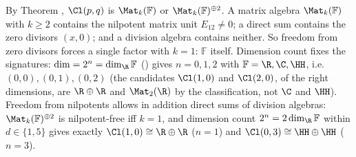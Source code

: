 By Theorem , $\Cl(p,q)$ is $\Mat_k(\mathbb{F})$ or $\Mat_k(\mathbb{F})^{\oplus 2}$. A matrix algebra $\Mat_k(\mathbb{F})$ with $k \geq 2$ contains the nilpotent matrix unit $E_{12} \neq 0$; a direct sum contains the zero divisors $(x, 0)$; and a division algebra contains neither. So freedom from zero divisors forces a single factor with $k = 1$: $\mathbb{F}$ itself. Dimension count fixes the signatures: $\dim = 2^n = \dim_\R \mathbb{F}$ () gives $n = 0, 1, 2$ with $\mathbb{F} = \R, \C, \HH$, i.e.\ $(0,0), (0,1), (0,2)$ (the candidates $\Cl(1,0)$ and $\Cl(2,0)$, of the right dimensions, are $\R \oplus \R$ and $\Mat_2(\R)$ by the classification, not $\C$ and $\HH$). Freedom from nilpotents allows in addition direct sums of division algebras: $\Mat_k(\mathbb{F})^{\oplus 2}$ is nilpotent-free iff $k = 1$, and dimension count $2^n = 2\dim_\R \mathbb{F}$ within $d \in \{1,5\}$ gives exactly $\Cl(1,0) \cong \R \oplus \R$ ($n=1$) and $\Cl(0,3) \cong \HH \oplus \HH$ ($n=3$).
